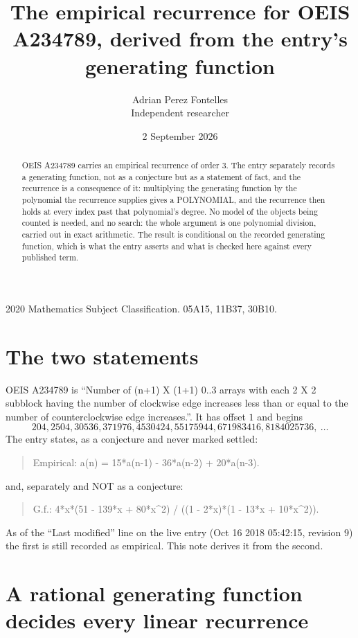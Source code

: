 \documentclass[11pt,a4paper]{article}
\title{The empirical recurrence for OEIS A234789, derived from the entry's generating function}
\author{Adrian Perez Fontelles\\ \small Independent researcher}
\date{2 September 2026}
\theoremstyle{plain}
\theoremstyle{definition}
\begin{document}
\maketitle

\begin{abstract}
OEIS A234789 carries an empirical recurrence of order $3$. The entry separately records a
generating function, not as a conjecture but as a statement of fact, and the recurrence is a
consequence of it: multiplying the generating function by the polynomial the recurrence
supplies gives a POLYNOMIAL, and the recurrence then holds at every index past that
polynomial's degree. No model of the objects being counted is needed, and no search: the
whole argument is one polynomial division, carried out in exact arithmetic. The result is
conditional on the recorded generating function, which is what the entry asserts and what is
checked here against every published term.
\end{abstract}

\noindent\small 2020 Mathematics Subject Classification. 05A15, 11B37, 30B10.\normalsize

\section{The two statements}

OEIS A234789 is ``Number of (n+1) X (1+1) 0..3 arrays with each 2 X 2 subblock having the number of clockwise edge increases less than or equal to the number of counterclockwise edge increases.''. It has offset $1$ and begins
\[
204, 2504, 30536, 371976, 4530424, 55175944, 671983416, 8184025736,\ \dots
\]
The entry states, as a conjecture and never marked settled:
\begin{quote}
Empirical: a(n) = 15*a(n-1) - 36*a(n-2) + 20*a(n-3).
\end{quote}
and, separately and NOT as a conjecture:
\begin{quote}
G.f.: 4*x*(51 - 139*x + 80*x\^{}2) / ((1 - 2*x)*(1 - 13*x + 10*x\^{}2)).
\end{quote}
As of the ``Last modified'' line on the live entry (Oct 16 2018 05:42:15, revision 9) the first is still
recorded as empirical. This note derives it from the second.

\section{A rational generating function decides every linear recurrence}
\end{document}
